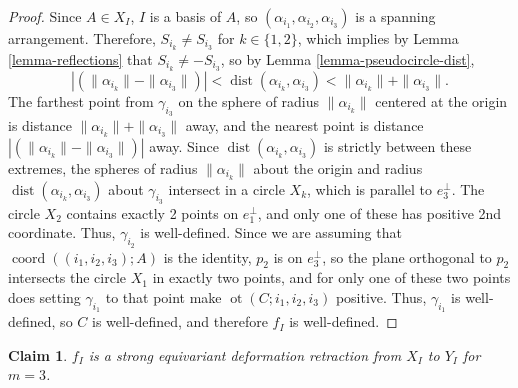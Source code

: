\documentclass[11pt]{article}
\numberwithin{equation}{section}
\newtheorem{claim}[theorem]{Claim}
\theoremstyle{remark}
\DeclareMathOperator{\dist}{dist}
\DeclareMathOperator{\coord}{coord}
\DeclareMathOperator{\ot}{ot}
\begin{document}
\begin{proof}
Since $A \in X_I$, $I$ is a basis of $A$, so $(\alpha_{i_1},\alpha_{i_2},\alpha_{i_3})$ is a spanning arrangement. Therefore, $S_{i_k} \neq S_{i_3}$ for $k \in \{1,2\}$, which implies by Lemma \ref{lemma-reflections} that $S_{i_k} \neq -S_{i_3}$, so by Lemma \ref{lemma-pseudocircle-dist},
\[ |(\|\alpha_{i_k}\| - \|\alpha_{i_3}\|)| < \dist(\alpha_{i_k},\alpha_{i_3}) < \|\alpha_{i_k}\| +\|\alpha_{i_3}\|. \]
The farthest point from $\gamma_{i_3}$ on the sphere of radius $\|\alpha_{i_k}\|$ centered at the origin is distance $\|\alpha_{i_k}\| +\|\alpha_{i_3}\|$ away, and the nearest point is distance $|(\|\alpha_{i_k}\| - \|\alpha_{i_3}\|)|$ away. Since $\dist(\alpha_{i_k},\alpha_{i_3})$ is strictly between these extremes, the spheres of radius $\|\alpha_{i_k}\|$ about the origin and radius $\dist(\alpha_{i_k},\alpha_{i_3})$ about $\gamma_{i_3}$ intersect in a circle $X_k$, which is parallel to $e_3^\bot$.
The circle $X_2$ contains exactly 2 points on $e_1^\bot$, and only one of these has positive 2nd coordinate.
Thus, $\gamma_{i_2}$ is well-defined.
Since we are assuming that $\coord((i_1,i_2,i_3);A)$ is the identity,
$p_2$ is on $e_3^\bot$, so the plane orthogonal to $p_2$ intersects the circle $X_1$ in exactly two points, and for only one of these two points does setting $\gamma_{i_1}$ to that point make $\ot(C;i_1,i_2,i_3)$ positive.
Thus, $\gamma_{i_1}$ is well-defined, so $C$ is well-defined, and therefore $f_I$ is well-defined.
\end{proof}

\begin{claim}\label{claim-deform-f3}
$f_I$ is a strong equivariant deformation retraction from $X_I$ to $Y_I$ for $m=3$.
\end{claim}
\end{document}
